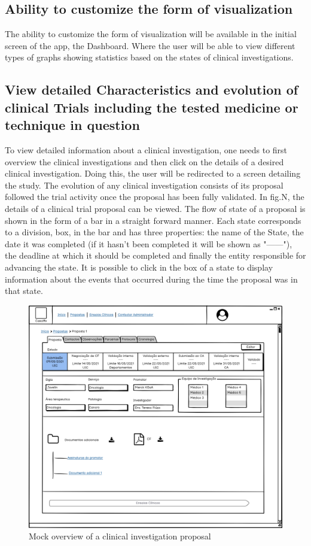 \subsection{Ability to customize the form of visualization}
The ability to customize the form of visualization will be available in the initial screen of the app, the Dashboard. Where the user will be able to view different types of graphs showing statistics based on the states of clinical investigations.

\subsection{View detailed Characteristics and evolution of clinical Trials including the tested medicine or technique in question}

To view detailed information about a clinical investigation, one needs to first overview the clinical investigations and then click on the details of a desired clinical investigation. Doing this, the user will be redirected to a screen detailing the study.  
The evolution of any clinical investigation consists of its proposal followed the trial activity once the proposal has been fully validated.
In fig.N, the details of a clinical trial proposal can be viewed. The flow of state of a proposal is shown in the form of a bar in a straight forward manner. Each state corresponds to a division, box, in the bar and has three properties: the name of the State, the date it was completed (if it hasn't been completed it will be shown as "------"), the deadline at which it should be completed and finally the entity responsible for advancing the state.  
It is possible to click in the box of a state to display information about the events that occurred during the time the proposal was in that state. 

\begin{figure}
    \centering
    \includegraphics{images/proposta-detalhe.png}
    \caption{Mock overview of a clinical investigation proposal}
    \label{fig:proposta-detalhe}
\end{figure}

